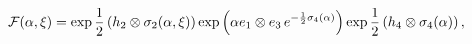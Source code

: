 \begin{equation}\label{llm2.15}
{\cal F}(\alpha, \xi)=\exp \frac{1}{2} \left( h_{2}
\otimes {\bf \sigma
}_{2}{(\alpha, \xi)}\right) \exp \left( \alpha e_{1}
\otimes
e_{3}\,
e^{-\frac{1}{2}{ \sigma }_{4}(\alpha)}\right) \exp
\frac{1}{2}\left( h_{4}\otimes {\bf \sigma }_{4}{(\alpha)}\right)
, \label{param-tw}
\end{equation}%
